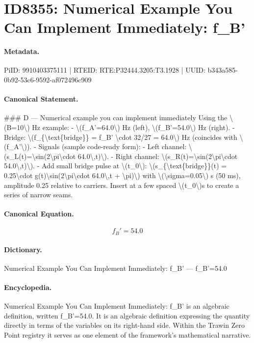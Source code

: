 \section*{ID8355: Numerical Example You Can Implement Immediately: f\_B'}
\paragraph{Metadata.}
PiID: 9910403375111 | RTEID: RTE:P32444.3205:T3.1928 | UUID: b343a585-0b92-53c6-9592-af072496c909

\paragraph{Canonical Statement.}
\#\#\# D — Numerical example you can implement immediately Using the \textbackslash{}(B=10\textbackslash{}) Hz example: - \textbackslash{}(f\_A'=64.0\textbackslash{}) Hz (left), \textbackslash{}(f\_B'=54.0\textbackslash{}) Hz (right). - Bridge: \textbackslash{}(f\_\{\textbackslash{}text\{bridge\}\} = f\_B' \textbackslash{}cdot 32/27 = 64.0\textbackslash{}) Hz (coincides with \textbackslash{}(f\_A'\textbackslash{})). - Signals (sample code-ready form): - Left channel: \textbackslash{}(s\_L(t)=\textbackslash{}sin(2\textbackslash{}pi\textbackslash{}cdot 64.0\textbackslash{},t)\textbackslash{}). - Right channel: \textbackslash{}(s\_R(t)=\textbackslash{}sin(2\textbackslash{}pi\textbackslash{}cdot 54.0\textbackslash{},t)\textbackslash{}). - Add small bridge pulse at \textbackslash{}(t\_0\textbackslash{}): \textbackslash{}(s\_\{\textbackslash{}text\{bridge\}\}(t) = 0.25\textbackslash{}cdot g(t)\textbackslash{}sin(2\textbackslash{}pi\textbackslash{}cdot 64.0\textbackslash{},t + \textbackslash{}pi)\textbackslash{}) with \textbackslash{}(\textbackslash{}sigma=0.05\textbackslash{}) s (50 ms), amplitude 0.25 relative to carriers. Insert at a few spaced \textbackslash{}(t\_0\textbackslash{})s to create a series of narrow seams.

\paragraph{Canonical Equation.}
\[
f_B'=54.0
\]

\paragraph{Dictionary.}
Numerical Example You Can Implement Immediately: f\_B' — f\_B'=54.0

\paragraph{Encyclopedia.}
Numerical Example You Can Implement Immediately: f\_B' is an algebraic definition, written f\_B'=54.0. It is an algebraic definition expressing the quantity directly in terms of the variables on its right-hand side. Within the Trawin Zero Point registry it serves as one element of the framework's mathematical narrative.
